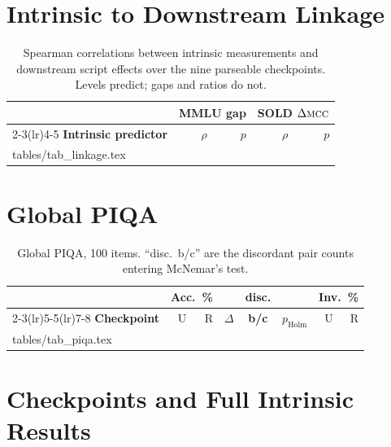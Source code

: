 \documentclass[11pt]{article}
\makeatletter
\newcommand{\mcc}{\textsc{mcc}}
\newcommand{\rows}[1]{\@@input #1 }
\makeatother
\begin{document}
\section{Intrinsic to Downstream Linkage}
\label{sec:linkage}

\begin{table}[h]
\centering\small
\setlength{\tabcolsep}{4pt}
\begin{tabular}{@{}lrrrr@{}}
\toprule
& \multicolumn{2}{c}{\textbf{MMLU gap}} & \multicolumn{2}{c}{\textbf{SOLD} $\Delta\mcc$} \\
\cmidrule(lr){2-3}\cmidrule(lr){4-5}
\textbf{Intrinsic predictor} & $\rho$ & $p$ & $\rho$ & $p$ \\
\midrule
\rows{tables/tab_linkage.tex}
\bottomrule
\end{tabular}
\caption{Spearman correlations between intrinsic measurements and downstream script
effects over the nine parseable checkpoints. Levels predict; gaps and ratios do not.}
\label{tab:linkage}
\end{table}

\section{Global PIQA}
\label{sec:piqa}

\begin{table}[h]
\centering\footnotesize
\setlength{\tabcolsep}{2.2pt}
\begin{tabular}{@{}lrrrcrrr@{}}
\toprule
& \multicolumn{2}{c}{Acc.\ \%} & & \textbf{disc.} & & \multicolumn{2}{c}{\textbf{Inv.\ \%}} \\
\cmidrule(lr){2-3}\cmidrule(lr){5-5}\cmidrule(lr){7-8}
\textbf{Checkpoint} & U & R & \boldmath$\Delta$ & \textbf{b/c}
& \boldmath$p_{\text{Holm}}$ & U & R \\
\midrule
\rows{tables/tab_piqa.tex}
\bottomrule
\end{tabular}
\caption{Global PIQA, 100 items. ``disc.\ b/c'' are the discordant pair counts
entering McNemar's test.}
\label{tab:piqa}
\end{table}

\section{Checkpoints and Full Intrinsic Results}
\label{sec:models}
\end{document}
